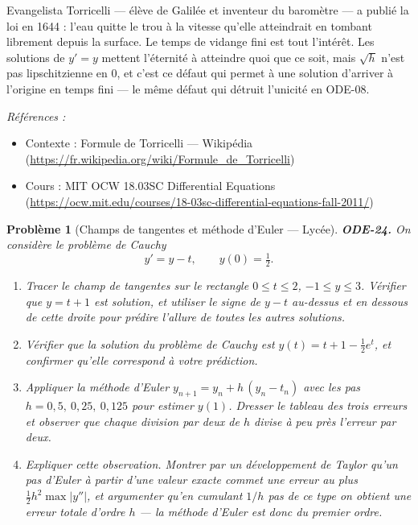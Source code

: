 \documentclass[11pt]{article}
\newtheorem{problem}{Problème}
\newenvironment{refs}{\par\small\noindent\emph{Références :}\begin{itemize}\setlength\itemsep{0pt}}{\end{itemize}\normalsize}
\begin{document}
\noindent Evangelista Torricelli --- élève de Galilée et inventeur du baromètre --- a publié
la loi en 1644 : l'eau quitte le trou à la vitesse qu'elle atteindrait en tombant librement depuis
la surface. Le temps de vidange fini est tout l'intérêt. Les solutions de $ y' = y $ mettent
l'éternité à atteindre quoi que ce soit, mais $ \sqrt{h} $ n'est pas lipschitzienne en $ 0 $,
et c'est ce défaut qui permet à une solution d'arriver à l'origine en temps fini --- le même défaut
qui détruit l'unicité en ODE-08.

\begin{refs}
\item Contexte : Formule de Torricelli --- Wikipédia (\url{https://fr.wikipedia.org/wiki/Formule_de_Torricelli})
\item Cours : MIT OCW 18.03SC Differential Equations (\url{https://ocw.mit.edu/courses/18-03sc-differential-equations-fall-2011/})
\end{refs}

\bigskip

\begin{problem}[{Champs de tangentes et méthode d'Euler --- Lycée}]
\textbf{ODE-24.} On considère le problème de Cauchy
\[ y' = y - t, \qquad y(0) = \tfrac{1}{2}. \]
\begin{enumerate}
\item[(a)] Tracer le champ de tangentes sur le rectangle $ 0 \le t \le 2 $, $ -1 \le y \le 3 $.
Vérifier que $ y = t + 1 $ est solution, et utiliser le signe de $ y - t $ au-dessus et
en dessous de cette droite pour prédire l'allure de toutes les autres solutions.
\item[(b)] Vérifier que la solution du problème de Cauchy est
$ y(t) = t + 1 - \tfrac{1}{2}e^{t} $, et confirmer qu'elle correspond à votre prédiction.
\item[(c)] Appliquer la méthode d'Euler $ y_{n+1} = y_n + h\,(y_n - t_n) $ avec les pas
$ h = 0{,}5,\ 0{,}25,\ 0{,}125 $ pour estimer $ y(1) $. Dresser le tableau des trois erreurs
et observer que chaque division par deux de $ h $ divise à peu près l'erreur par deux.
\item[(d)] Expliquer cette observation. Montrer par un développement de Taylor qu'un pas d'Euler à
partir d'une valeur exacte commet une erreur au plus $ \tfrac{1}{2}h^2 \max|y''| $, et
argumenter qu'en cumulant $ 1/h $ pas de ce type on obtient une erreur totale d'ordre $ h $ ---
la méthode d'Euler est donc du \textit{premier ordre}.
\end{enumerate}

\end{problem}
\end{document}

